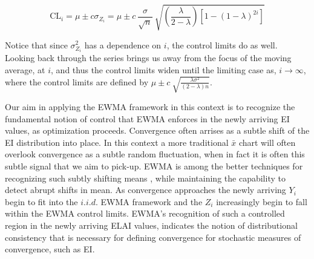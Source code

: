 \documentclass{article}
\begin{document}
%
%
\begin{equation}
\text{CL}_i = \mu \pm c \sigma_{Z_i}
=  \mu \pm c ~ \frac{\sigma}{\sqrt{n}}~\sqrt{\left(\frac{\lambda}{2-\lambda}\right)\left[1-(1-\lambda)^{2i}\right]}
\label{EWMACL}
\end{equation}
%
%

%
Notice that since $\sigma^2_{Z_i}$ has a dependence on $i$, the control limits do as well.
Looking back through the series brings us away from the focus of the moving 
average, at $i$, and thus the control limits widen until the limiting case as, 
$i\rightarrow\infty$, where the control limits are defined by 
$\mu \pm c ~ \sqrt{\frac{\lambda\sigma^2}{(2-\lambda)n}}$.

%
Our aim in applying the EWMA framework in this context is to recognize the 
fundamental notion of control that EWMA enforces in the newly arriving EI 
values, as optimization proceeds. Convergence often arrises as a subtle shift 
of the EI distribution into place. In this context a more traditional $\bar x$ 
chart will often overlook convergence as a subtle random fluctuation, when in 
fact it is often this subtle signal that we aim to pick-up. EWMA is among the 
better techniques for recognizing such subtly shifting means \cite{aerne1991trend,zou2009compare}, 
while maintaining the capability to detect abrupt shifts in mean. As 
convergence approaches the newly arriving $Y_i$ begin to fit into the $i.i.d.$ 
EWMA framework and the $Z_i$ increasingly begin to fall within the EWMA 
control limits. EWMA's recognition of such a controlled region in the newly 
arriving ELAI values, indicates the notion of distributional consistency that 
is necessary for defining convergence for stochastic measures of convergence, 
such as EI. 



\end{document}
